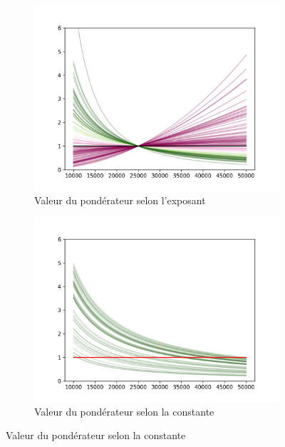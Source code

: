 \begin{figure}[h!]
    \centering
    
    \begin{subfigure}{0.45\textwidth}
        \centering
        \includegraphics[width=\textwidth]{results/exponent.png} %
        \caption{Valeur du pondérateur selon l'exposant}
        \label{fig:expo}
    \end{subfigure}
    
    \begin{subfigure}{0.45\textwidth}
        \centering
        \includegraphics[width=\textwidth]{results/norm_constant.png} %
        \caption{Valeur du pondérateur selon la constante}
        \label{fig:const}
    \end{subfigure}


\end{figure}

